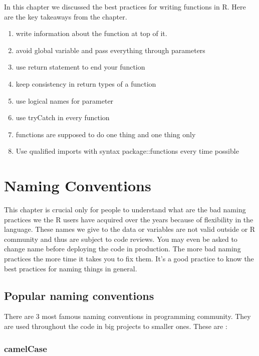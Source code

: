 \documentclass[
]{book}
\providecommand{\tightlist}{%
  \setlength{\itemsep}{0pt}\setlength{\parskip}{0pt}}
\begin{document}
In this chapter we discussed the best practices for writing functions in R. Here are the key takeaways from the chapter.

\begin{enumerate}
\def\labelenumi{\arabic{enumi}.}
\tightlist
\item
  write information about the function at top of it.
\item
  avoid global variable and pass everything through parameters
\item
  use return statement to end your function
\item
  keep consistency in return types of a function
\item
  use logical names for parameter
\item
  use tryCatch in every function
\item
  functions are supposed to do one thing and one thing only
\item
  Use qualified imports with syntax package::functions every time possible
\end{enumerate}

\hypertarget{names}{%
\chapter{Naming Conventions}\label{names}}

This chapter is crucial only for people to understand what are the bad naming practices we the R users have acquired over the years because of flexibility in the language. These names we give to the data or variables are not valid outside or R community and thus are subject to code reviews. You may even be asked to change name before deploying the code in production. The more bad naming practices the more time it takes you to fix them. It's a good practice to know the best practices for naming things in general.

\hypertarget{popular-naming-conventions}{%
\section{Popular naming conventions}\label{popular-naming-conventions}}

There are 3 most famous naming conventions in programming community. They are used throughout the code in big projects to smaller ones. These are :

\hypertarget{camelcase}{%
\subsection{camelCase}\label{camelcase}}
\end{document}
